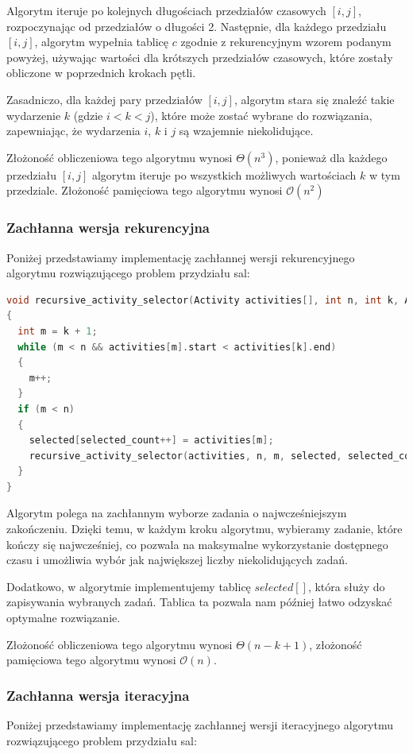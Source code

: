 \documentclass{article}
\newcommand{\bigO}{\mathcal{O}}
\begin{document}
Algorytm iteruje po kolejnych długościach przedziałów czasowych $[i, j]$, rozpoczynając od przedziałów o długości 2. Następnie, dla każdego przedziału $[i, j]$, algorytm wypełnia tablicę $c$ zgodnie z rekurencyjnym wzorem podanym powyżej, używając wartości dla krótszych przedziałów czasowych, które zostały obliczone w poprzednich krokach pętli.

Zasadniczo, dla każdej pary przedziałów $[i, j]$, algorytm stara się znaleźć takie wydarzenie $k$ (gdzie $i < k < j$), które może zostać wybrane do rozwiązania, zapewniając, że wydarzenia $i$, $k$ i $j$ są wzajemnie niekolidujące.

Złożoność obliczeniowa tego algorytmu wynosi $\Theta(n^3)$, ponieważ dla każdego przedziału $[i, j]$ algorytm iteruje po wszystkich możliwych wartościach $k$ w tym przedziale. Złożoność pamięciowa tego algorytmu wynosi $\bigO(n^2)$
\subsubsection{Zachłanna wersja rekurencyjna}
Poniżej przedstawiamy implementację zachłannej wersji rekurencyjnego algorytmu rozwiązującego problem przydziału sal:
\begin{lstlisting}[style=mystyle, language=C++, caption={Implementacja \texttt{greedy\_recursive\_activity\_selector}}, label={lst:recursive_activity_selector}]
void recursive_activity_selector(Activity activities[], int n, int k, Activity selected[], int &selected_count)
{
  int m = k + 1;
  while (m < n && activities[m].start < activities[k].end)
  {
    m++;
  }
  if (m < n)
  {
    selected[selected_count++] = activities[m];
    recursive_activity_selector(activities, n, m, selected, selected_count);
  }
}
\end{lstlisting}
Algorytm polega na zachłannym wyborze zadania o najwcześniejszym zakończeniu. Dzięki temu, w każdym kroku algorytmu, wybieramy zadanie, które kończy się najwcześniej, co pozwala na maksymalne wykorzystanie dostępnego czasu i umożliwia wybór jak największej liczby niekolidujących zadań.

Dodatkowo, w algorytmie implementujemy tablicę $selected[]$, która służy do zapisywania wybranych zadań. Tablica ta pozwala nam później łatwo odzyskać optymalne rozwiązanie.

Złożoność obliczeniowa tego algorytmu wynosi $\Theta(n-k+1)$, złożoność pamięciowa tego algorytmu wynosi $\bigO(n)$.
\subsubsection{Zachłanna wersja iteracyjna}
Poniżej przedstawiamy implementację zachłannej wersji iteracyjnego algorytmu rozwiązującego problem przydziału sal:
\end{document}
